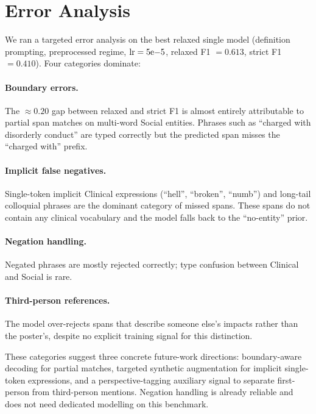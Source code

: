 \documentclass[11pt]{article}
\begin{document}
\section{Error Analysis}
\label{sec:error}

We ran a targeted error analysis on the best relaxed single model
(definition prompting, preprocessed regime, $\mathrm{lr}=5{\rm e}{-5}$,
relaxed F1 $= 0.613$, strict F1 $= 0.410$). Four categories dominate:

\paragraph{Boundary errors.} The $\approx 0.20$ gap between relaxed and
strict F1 is almost entirely attributable to partial span matches on
multi-word Social entities. Phrases such as ``charged with disorderly
conduct'' are typed correctly but the predicted span misses the
``charged with'' prefix.

\paragraph{Implicit false negatives.} Single-token implicit Clinical
expressions (``hell'', ``broken'', ``numb'') and long-tail colloquial
phrases are the dominant category of missed spans. These spans do not
contain any clinical vocabulary and the model falls back to the
``no-entity'' prior.

\paragraph{Negation handling.} Negated phrases are mostly rejected
correctly; type confusion between Clinical and Social is rare.

\paragraph{Third-person references.} The model over-rejects spans that
describe someone else's impacts rather than the poster's, despite no
explicit training signal for this distinction.

These categories suggest three concrete future-work directions:
boundary-aware decoding for partial matches, targeted synthetic
augmentation for implicit single-token expressions, and a
perspective-tagging auxiliary signal to separate first-person from
third-person mentions. Negation handling is already reliable and does
not need dedicated modelling on this benchmark.
\end{document}
